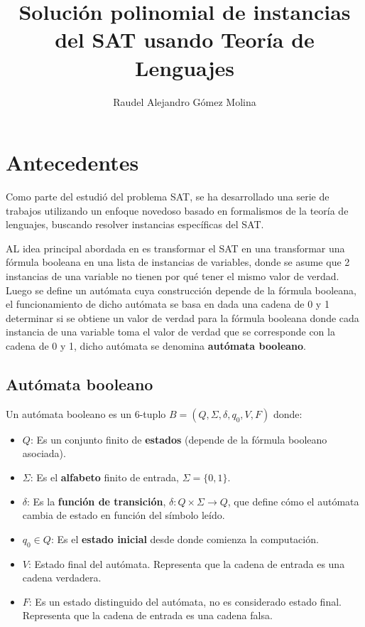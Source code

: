 \documentclass{article}
\title{Solución polinomial de instancias del SAT usando Teoría de Lenguajes}
\author{Raudel Alejandro Gómez Molina}
\begin{document}
\maketitle

\section{Antecedentes}

Como parte del estudió del problema SAT, se ha desarrollado una serie de trabajos utilizando un enfoque
novedoso basado en formalismos de la teoría de lenguajes, buscando resolver instancias específicas del SAT.

AL idea principal abordada en \cite{aCFSAT} es transformar el SAT en una transformar una fórmula booleana en una lista de instancias de variables,
donde se asume que 2 instancias de una variable no tienen por qué tener el mismo valor de verdad. Luego
se define un autómata cuya construcción depende de la fórmula booleana, el funcionamiento
de dicho autómata se basa en dada una cadena de 0 y 1 determinar si se obtiene un valor
de verdad para la fórmula booleana donde cada instancia de una variable toma el valor de verdad que se
corresponde con la cadena de 0 y 1, dicho autómata se denomina \textbf{autómata booleano}.

\subsection{Autómata booleano}

Un autómata booleano \cite{aCFSAT} es un 6-tuplo $B=(Q,\Sigma,\delta,q_0,V,F)$ donde:

\begin{itemize}
      \item $Q$: Es un conjunto finito de \textbf{estados} (depende de la fórmula booleano asociada).
      \item $\Sigma$: Es el \textbf{alfabeto} finito de entrada, $\Sigma =\{0,1\}$.
      \item $\delta$: Es la \textbf{función de transición}, $\delta: Q \times \Sigma \to Q$, que define cómo el autómata cambia de estado en función del símbolo leído.
      \item $q_0 \in Q$: Es el \textbf{estado inicial} desde donde comienza la computación.
      \item  $V$: Estado final del autómata. Representa que la cadena de entrada es una
            cadena verdadera.
      \item  $F$: Es un estado distinguido del autómata, no es considerado estado final.
            Representa que la cadena de entrada es una cadena falsa.

\end{itemize}
\end{document}
